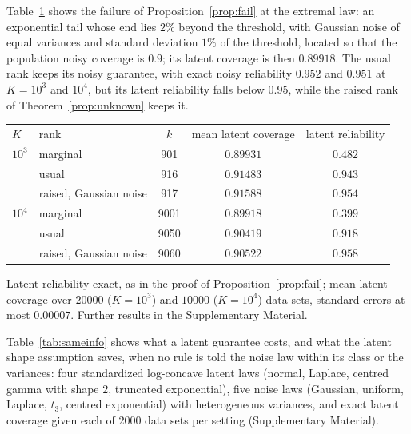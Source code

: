 \documentclass[lineno]{biometrika}
\begin{document}
Table~\ref{tab:stress} shows the failure of Proposition~\ref{prop:fail} at the extremal law: an exponential tail whose end lies $2\%$ beyond the threshold, with Gaussian noise of equal variances and standard deviation $1\%$ of the threshold, located so that the population noisy coverage is $0.9$; its latent coverage is then $0.89918$. The usual rank keeps its noisy guarantee, with exact noisy reliability $0.952$ and $0.951$ at $K = 10^3$ and $10^4$, but its latent reliability falls below $0.95$, while the raised rank of Theorem~\ref{prop:unknown} keeps it.

\begin{table}
{\begin{tabular}{llccc}
$K$ & rank & $k$ & mean latent coverage & latent reliability \\
$10^3$ & marginal & 901 & $0.89931$ & $0.482$ \\
 & usual & 916 & $0.91483$ & $0.943$ \\
 & raised, Gaussian noise & 917 & $0.91588$ & $0.954$ \\
$10^4$ & marginal & 9001 & $0.89918$ & $0.399$ \\
 & usual & 9050 & $0.90419$ & $0.918$ \\
 & raised, Gaussian noise & 9060 & $0.90522$ & $0.958$ \\
\end{tabular}}
\label{tab:stress}
\begin{tabnote}
Latent reliability exact, as in the proof of Proposition~\ref{prop:fail}; mean latent coverage over $20000$ ($K = 10^3$) and $10000$ ($K = 10^4$) data sets, standard errors at most $0.00007$. Further results in the Supplementary Material.
\end{tabnote}
\end{table}

Table~\ref{tab:sameinfo} shows what a latent guarantee costs, and what the latent shape assumption saves, when no rule is told the noise law within its class or the variances: four standardized log-concave latent laws (normal, Laplace, centred gamma with shape $2$, truncated exponential), five noise laws (Gaussian, uniform, Laplace, $t_3$, centred exponential) with heterogeneous variances, and exact latent coverage given each of $2000$ data sets per setting (Supplementary Material).
\end{document}
